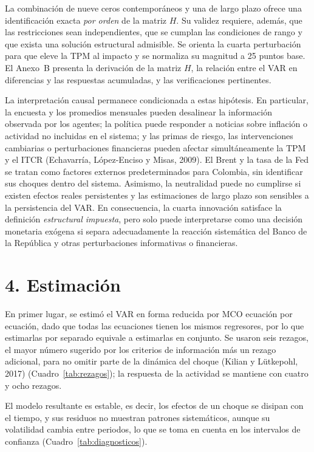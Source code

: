 \documentclass[12pt,letterpaper]{article}
\begin{document}
La combinación de nueve ceros contemporáneos y una de largo plazo ofrece una identificación exacta \emph{por orden} de la matriz $H$. Su validez requiere, además, que las restricciones sean independientes, que se cumplan las condiciones de rango y que exista una solución estructural admisible. Se orienta la cuarta perturbación para que eleve la TPM al impacto y se normaliza su magnitud a 25 puntos base. El Anexo~B presenta la derivación de la matriz $H$, la relación entre el VAR en diferencias y las respuestas acumuladas, y las verificaciones pertinentes.

La interpretación causal permanece condicionada a estas hipótesis. En particular, la encuesta y los promedios mensuales pueden desalinear la información observada por los agentes; la política puede responder a noticias sobre inflación o actividad no incluidas en el sistema; y las primas de riesgo, las intervenciones cambiarias o perturbaciones financieras pueden afectar simultáneamente la TPM y el ITCR (Echavarría, López-Enciso y Misas, 2009). El Brent y la tasa de la Fed se tratan como factores externos predeterminados para Colombia, sin identificar sus choques dentro del sistema. Asimismo, la neutralidad puede no cumplirse si existen efectos reales persistentes y las estimaciones de largo plazo son sensibles a la persistencia del VAR. En consecuencia, la cuarta innovación satisface la definición \emph{estructural impuesta}, pero solo puede interpretarse como una decisión monetaria exógena si separa adecuadamente la reacción sistemática del Banco de la República y otras perturbaciones informativas o financieras.

\section*{4. Estimaci\'on}

En primer lugar, se estimó el VAR en forma reducida por MCO ecuación por ecuación, dado que todas las ecuaciones tienen los mismos regresores, por lo que estimarlas por separado equivale a estimarlas en conjunto. Se usaron seis rezagos, el mayor número sugerido por los criterios de información más un rezago adicional, para no omitir parte de la dinámica del choque (Kilian y Lütkepohl, 2017) (Cuadro~\ref{tab:rezagos}); la respuesta de la actividad se mantiene con cuatro y ocho rezagos.

El modelo resultante es estable, es decir, los efectos de un choque se disipan con el tiempo, y sus residuos no muestran patrones sistemáticos, aunque su volatilidad cambia entre periodos, lo que se toma en cuenta en los intervalos de confianza (Cuadro~\ref{tab:diagnosticos}).
\end{document}
